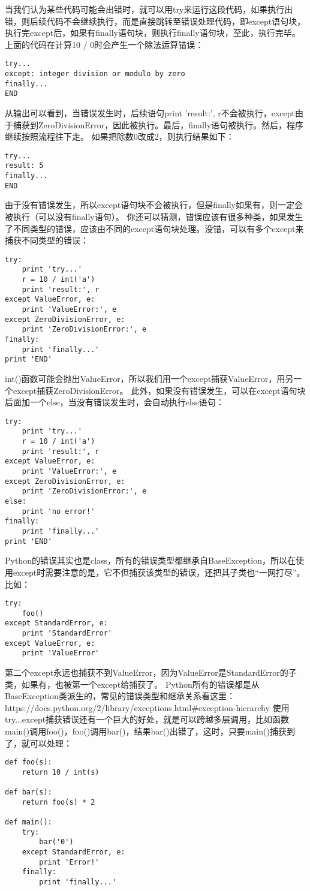 \documentclass[twoside,11pt]{book}
\begin{document}
当我们认为某些代码可能会出错时，就可以用try来运行这段代码，如果执行出错，则后续代码不会继续执行，而是直接跳转至错误处理代码，即except语句块，执行完except后，如果有finally语句块，则执行finally语句块，至此，执行完毕。
上面的代码在计算10 / 0时会产生一个除法运算错误：
\begin{lstlisting}
try...
except: integer division or modulo by zero
finally...
END
\end{lstlisting}

从输出可以看到，当错误发生时，后续语句print 'result:', r不会被执行，except由于捕获到ZeroDivisionError，因此被执行。最后，finally语句被执行。然后，程序继续按照流程往下走。
如果把除数0改成2，则执行结果如下：
\begin{lstlisting}
try...
result: 5
finally...
END
\end{lstlisting}

由于没有错误发生，所以except语句块不会被执行，但是finally如果有，则一定会被执行（可以没有finally语句）。
你还可以猜测，错误应该有很多种类，如果发生了不同类型的错误，应该由不同的except语句块处理。没错，可以有多个except来捕获不同类型的错误：
\begin{lstlisting}
try:
    print 'try...'
    r = 10 / int('a')
    print 'result:', r
except ValueError, e:
    print 'ValueError:', e
except ZeroDivisionError, e:
    print 'ZeroDivisionError:', e
finally:
    print 'finally...'
print 'END'
\end{lstlisting}

int()函数可能会抛出ValueError，所以我们用一个except捕获ValueError，用另一个except捕获ZeroDivisionError。
此外，如果没有错误发生，可以在except语句块后面加一个else，当没有错误发生时，会自动执行else语句：
\begin{lstlisting}
try:
    print 'try...'
    r = 10 / int('a')
    print 'result:', r
except ValueError, e:
    print 'ValueError:', e
except ZeroDivisionError, e:
    print 'ZeroDivisionError:', e
else:
    print 'no error!'
finally:
    print 'finally...'
print 'END'
\end{lstlisting}

Python的错误其实也是class，所有的错误类型都继承自BaseException，所以在使用except时需要注意的是，它不但捕获该类型的错误，还把其子类也“一网打尽”。比如：
\begin{lstlisting}
try:
    foo()
except StandardError, e:
    print 'StandardError'
except ValueError, e:
    print 'ValueError'
\end{lstlisting}

第二个except永远也捕获不到ValueError，因为ValueError是StandardError的子类，如果有，也被第一个except给捕获了。
Python所有的错误都是从BaseException类派生的，常见的错误类型和继承关系看这里：
https://docs.python.org/2/library/exceptions.html\#exception-hierarchy
使用try...except捕获错误还有一个巨大的好处，就是可以跨越多层调用，比如函数main()调用foo()，foo()调用bar()，结果bar()出错了，这时，只要main()捕获到了，就可以处理：
\begin{lstlisting}
def foo(s):
    return 10 / int(s)

def bar(s):
    return foo(s) * 2

def main():
    try:
        bar('0')
    except StandardError, e:
        print 'Error!'
    finally:
        print 'finally...'
\end{lstlisting}
\end{document}
